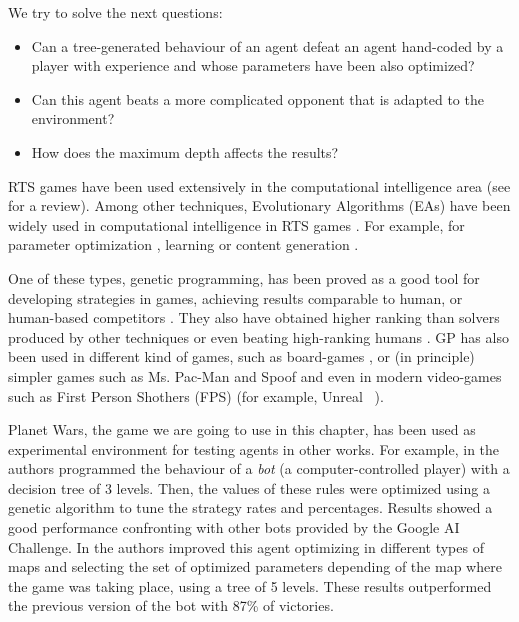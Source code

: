 We try to solve the next questions: 
\begin{itemize}
\item Can a tree-generated behaviour of an agent defeat an agent hand-coded by a player with experience and whose parameters have been also optimized?
\item Can this agent beats a more complicated opponent that is adapted to the environment?
\item How does the maximum depth affects the results?
\end{itemize}




RTS games have been used extensively in the computational intelligence area (see \cite{Lara2013review} for a review).
Among other techniques, Evolutionary Algorithms (EAs) have been widely used in computational intelligence in RTS games \cite{Lara2013review}. For example, for parameter optimization \cite{Esparcia10FPS}, learning \cite{Kenneth2005neuroevolution} or content generation \cite{Mahlmann2012MapGeneration}. 

One of these types, genetic programming, has been proved as a good tool for developing strategies in games, achieving results comparable to human, or human-based competitors \cite{Sipper2007gameplaying}. They also have obtained higher ranking than solvers produced by other techniques or even beating high-ranking humans \cite{Elyasaf2012FreeCell}. GP has also been used in different kind of games, such as board-games \cite{Benbassat2012Reversi}, or (in principle) simpler games such as Ms. Pac-Man \cite{Brandstetter2012PacMan} and Spoof \cite{Wittkamp2007spoof} and even in modern video-games such as First Person Shothers (FPS) (for example, Unreal\texttrademark~ \cite{Esparcia2013GPunreal}).


Planet Wars, the game we are going to use in this chapter, has been used as experimental environment for testing agents in other works. For example, in
\cite{Mora2012Genebot} the authors programmed the behaviour of a {\em bot} (a computer-controlled player) with a decision tree of 3 levels. Then, the values of these rules were optimized using a genetic algorithm to tune the strategy rates and percentages.  %
  Results showed a good performance confronting with other bots
  provided by the Google AI Challenge. 
  In \cite{FernandezAres2012adaptive} the authors improved this agent optimizing
  in different types of maps and selecting the set of optimized
  parameters depending of the map where the game was taking place,
  using a tree of 5 levels. These results outperformed the previous
  version of the bot with 87\% of victories. 

